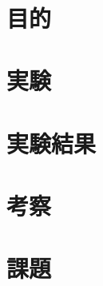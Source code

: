 \documentclass[uplatex, 11pt,a4j, titlepage]{jsarticle}
\begin{document}

\newpage




\newpage
\ 
\newpage

\section{目的}
\section{実験}
\section{実験結果}
\section{考察}
\section{課題}


\newpage
\thispagestyle{empty}
\nocite{Material}


\end{document}
